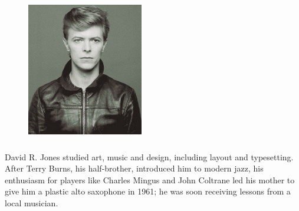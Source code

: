 \documentclass[12pt,letterpaper,oneside,final]{thesis}
\begin{document}



\clearpage {}






\begin{vita}

\begin{figure}
\includegraphics[width=2in,height=2.5in,clip,keepaspectratio]{headshot.jpg}
\end{figure}

David R. Jones studied art, music and design, including layout and typesetting. After Terry Burns, his half-brother, introduced him to modern jazz, his enthusiasm for players like Charles Mingus and John Coltrane led his mother to give him a plastic alto saxophone in 1961; he was soon receiving lessons from a local musician.

\end{vita}
\end{document}

